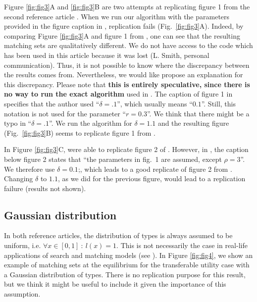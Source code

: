 Figure \ref{fig:fig3}A and \ref{fig:fig3}B are two attempts at replicating figure 1 from the second reference article \citep{smith_marriage_2006}. When we run our algorithm with the parameters provided in the figure caption in \citep{smith_marriage_2006}, replication fails (Fig.~\ref{fig:fig3}A). Indeed, by comparing Figure \ref{fig:fig3}A and figure 1 from \citep{smith_marriage_2006}, one can see that the resulting matching sets are qualitatively different. We do not have access to the code which has been used in this article because it was lost (L. Smith, personal communication). Thus, it is not possible to know where the discrepancy between the results comes from. Nevertheless, we would like propose an explanation for this discrepancy. Please note that \textbf{this is entirely speculative, since there is no way to run the exact algorithm} used in \citep{smith_marriage_2006}. The caption of figure 1 in \citep{smith_marriage_2006} specifies that the author used ``$\delta=.1$'', which usually means ``$0.1$''. Still, this notation is not used for the parameter ``$r=0.3$''. We think that there might be a typo in ``$\delta=.1$''. We run the algorithm for $\delta=1.1$ and the resulting figure (Fig.~\ref{fig:fig3}B) seems to replicate figure 1 from \citep{smith_marriage_2006}.

In Figure \ref{fig:fig3}C, were able to replicate figure 2 of \citep{smith_marriage_2006}. However, in \citep{smith_marriage_2006}, the caption below figure 2 states that ``the parameters in fig.~1 are assumed, except $\rho=3$''. We therefore use $\delta=0.1$;, which leads to a good replicate of figure 2 from \citep{smith_marriage_2006}. Changing $\delta$ to $1.1$, as we did for the previous figure, would lead to a replication failure (results not shown).


\subsection*{Gaussian distribution}

In both reference articles, the distribution of types is always assumed to be uniform, i.e. $\forall x \in [0,1] \ : \ l(x)=1$. This is not necessarily the case in real-life applications of search and matching models (see \citep{hagedorn_identifying_2017}). In Figure \ref{fig:fig4}, we show an example of matching sets at the equilibrium for the transferable utility case with a Gaussian distribution of types. There is no replication purpose for this result, but we think it might be useful to include it given the importance of this assumption.

